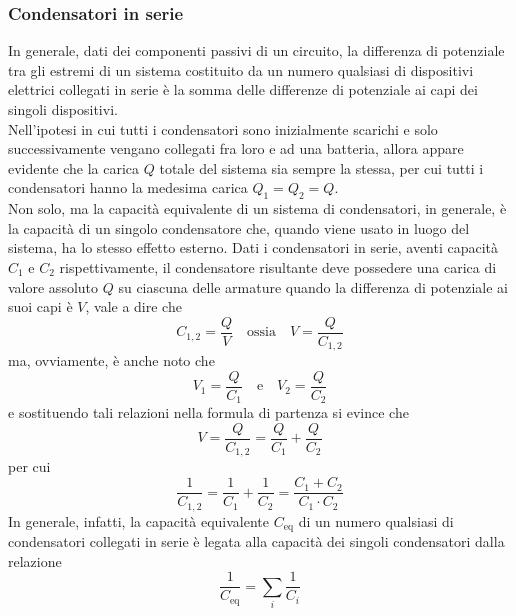 \documentclass[a4paper]{extarticle}
\begin{document}
\subsubsection{Condensatori in serie}
In generale, dati dei componenti passivi di un circuito, la differenza di potenziale tra gli estremi di un sistema costituito da un numero qualsiasi di dispositivi elettrici collegati in serie è la somma delle differenze di potenziale ai capi dei singoli dispositivi.\\
Nell'ipotesi in cui tutti i condensatori sono inizialmente scarichi e solo successivamente vengano collegati fra loro e ad una batteria, allora appare evidente che la carica $Q$ totale del sistema sia sempre la stessa, per cui tutti i condensatori hanno la medesima carica $Q_1=Q_2=Q$.\\
Non solo, ma la capacità equivalente di un sistema di condensatori, in generale, è la capacità di un singolo condensatore che, quando viene usato in luogo del sistema, ha lo stesso effetto esterno. Dati i condensatori in serie, aventi capacità $C_1$ e $C_2$ rispettivamente, il condensatore risultante deve possedere una carica di valore assoluto $Q$ su ciascuna delle armature quando la differenza di potenziale ai suoi capi è $V$, vale a dire che
\[C_{1,2}=\frac{Q}{V} \hspace{1em} \text{ossia} \hspace{1em} V=\frac{Q}{C_{1,2}}\]
ma, ovviamente, è anche noto che
\[V_1=\frac{Q}{C_1} \hspace{1em} \text{e} \hspace{1em} V_2=\frac{Q}{C_2}\]
e sostituendo tali relazioni nella formula di partenza si evince che
\[V=\frac{Q}{C_{1,2}}=\frac{Q}{C_{1}}+\frac{Q}{C_{2}}\]
per cui
\[\boxed{\frac{1}{C_{1,2}} = \frac{1}{C_1} + \frac{1}{C_2}=\frac{C_1+C_2}{C_1 \cdot C_2}}\]
In generale, infatti, la capacità equivalente $C_\text{eq}$ di un numero qualsiasi di condensatori collegati in serie è legata alla capacità dei singoli condensatori dalla relazione
\[\frac{1}{C_\text{eq}}=\sum_i\frac{1}{C_i}\]

\vspace{1em}
\noindent
\end{document}
